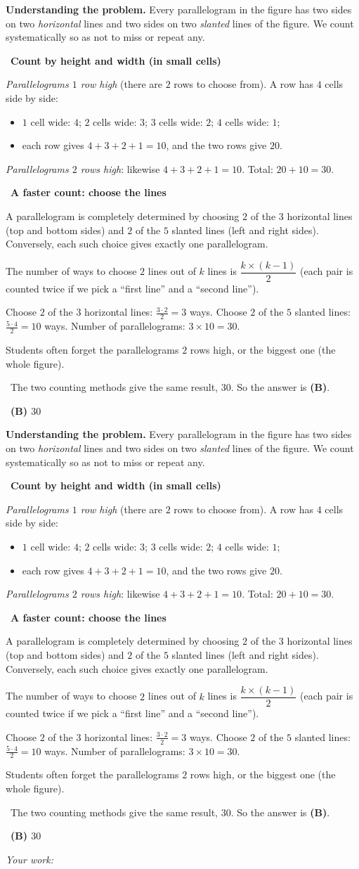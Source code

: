 \documentclass[11pt]{article}
\newif\ifsol \soltrue
\providecommand{\AnsWord}{Đáp số}
\newcommand{\StuProb}[2]{\begin{probboxS}{#1}{#2}\StuProbBody\end{probboxS}}
\newcommand{\ans}[1]{\par\smallskip{\bfseries\color{tmGreen!88!black}\AnsWord:}\ {\bfseries\color{AnsRed}#1}\par}
\newcommand{\probsol}[1]{%
  \begin{lrbox}{\solmeasure}\begin{minipage}{\dimexpr\linewidth-24pt\relax}#1\end{minipage}\end{lrbox}%
  \ifsol
    \begin{solbox}#1\end{solbox}%
  \else
    \setlength{\solht}{\dimexpr\ht\solmeasure+\dp\solmeasure+0.85cm\relax}%
    \ifdim\solht<1.35cm\setlength{\solht}{1.35cm}\fi
    \ifdim\solht>\StudentMaxWork\setlength{\solht}{\StudentMaxWork}\fi
    \par\noindent\begin{minipage}{\linewidth}%
    \expandafter\StuProb\StuProbArgs
    \begin{tcolorbox}[colback=white,colframe=Line,boxrule=0.8pt,arc=5pt,
      left=8pt,right=8pt,top=4pt,bottom=4pt,height=\solht]{\footnotesize\color{Slate}\itshape\WorkWord}\end{tcolorbox}%
    \end{minipage}\par\medskip
  \fi}
\newlength{\StudentMaxWork}\setlength{\StudentMaxWork}{4.5cm}
\newcommand{\step}[2]{\par\smallskip\noindent{\bfseries\color{tmBlue!85!black}\StepWord~#1.}\ {\bfseries #2}\par\nopagebreak}
\newcommand{\verify}[1]{\par\smallskip\noindent{\bfseries\color{tmGreen!80!black}\faCheckCircle\ \CheckWord}\ #1\par}
\def\WorkWord{Your work:}
\def\AnsWord{Answer}
\def\StepWord{Step}
\def\CheckWord{Check:}
\begin{document}
\probsol{
\textbf{Understanding the problem.} Every parallelogram in the figure has two sides on two \emph{horizontal}
lines and two sides on two \emph{slanted} lines of the figure. We count systematically so as not to miss or
repeat any.

\step{1}{Count by height and width (in small cells)}
\emph{Parallelograms $1$ row high} (there are $2$ rows to choose from). A row has $4$ cells side by side:
\begin{itemize}[leftmargin=1.4em,itemsep=1pt]
\item $1$ cell wide: $4$; $2$ cells wide: $3$; $3$ cells wide: $2$; $4$ cells wide: $1$;
\item each row gives $4+3+2+1=10$, and the two rows give $20$.
\end{itemize}
\emph{Parallelograms $2$ rows high}: likewise $4+3+2+1=10$. Total: $20+10=30$.

\step{2}{A faster count: choose the lines}
\begin{proofbox}A parallelogram is completely determined by choosing $2$ of the $3$ horizontal lines (top and
bottom sides) and $2$ of the $5$ slanted lines (left and right sides). Conversely, each such choice gives exactly
one parallelogram.\end{proofbox}
\begin{recallbox}The number of ways to choose $2$ lines out of $k$ lines is $\dfrac{k\times(k-1)}{2}$ (each pair
is counted twice if we pick a ``first line'' and a ``second line'').\end{recallbox}
Choose $2$ of the $3$ horizontal lines: $\tfrac{3\cdot 2}{2}=3$ ways. Choose $2$ of the $5$ slanted lines:
$\tfrac{5\cdot4}{2}=10$ ways. Number of parallelograms: $3\times 10=30$.

\begin{warnbox}Students often forget the parallelograms $2$ rows high, or the biggest one (the whole
figure).\end{warnbox}
\verify{The two counting methods give the same result, $30$. So the answer is \textbf{(B)}.}
\ans{(B) $30$}
}
\end{document}
